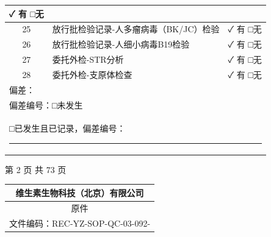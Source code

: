 \documentclass[UTF8,10pt,a4paper,fontset=fandol]{ctexart}
\newcommand{\fieldvalue}[1]{#1}
\newcommand{\handwritten}[1]{#1}
\begin{document}
\begin{center}
\begin{tabularx}{\textwidth}{|c|X|c|}
\fieldvalue{\handwritten{✓ 有}} \quad □无 \\
\hline
25 & 放行批检验记录-人多瘤病毒（BK/JC）检验 &
\fieldvalue{\handwritten{✓ 有}} \quad □无 \\
\hline
26 & 放行批检验记录-人细小病毒B19检验 &
\fieldvalue{\handwritten{✓ 有}} \quad □无 \\
\hline
27 & 委托外检-STR分析 &
\fieldvalue{\handwritten{✓ 有}} \quad □无 \\
\hline
28 & 委托外检-支原体检查 &
\fieldvalue{\handwritten{✓ 有}} \quad □无 \\
\hline
\multicolumn{3}{|l|}{偏差：} \\
\multicolumn{3}{|l|}{偏差编号：□未发生} \\
\multicolumn{3}{|l|}{□已发生且已记录，偏差编号：\rule{5cm}{0.4pt}} \\
\hline
\end{tabularx}
\end{center}

\begin{center}
第 2 页 共 73 页
\end{center}

\newpage

\begin{center}
\begin{tabularx}{\textwidth}{|p{}|X|}
\hline
\multicolumn{2}{|c|}{维生素生物科技（北京）有限公司}\\
\hline
\multicolumn{2}{|c|}{原件}\\
\hline
\multicolumn{2}{|c|}{文件编码：REC-YZ-SOP-QC-03-092-{}}
\\
\hline
\end{tabularx}
\end{center}
\end{document}
